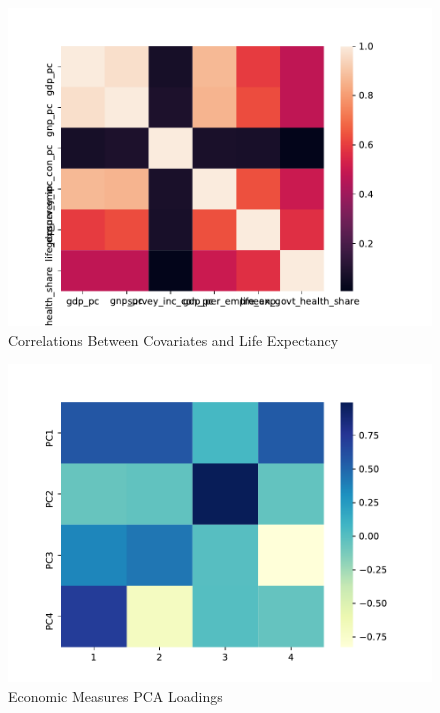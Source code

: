 \documentclass{report}
\begin{document}
	\begin{figure}[h!]
		\centering
		\caption{Correlations Between Covariates and Life Expectancy}
		\label{LE_Health_Econ_Correlations}	
		\includegraphics[width=\linewidth,keepaspectratio=true]{../Output/Figures/LE_Health_Econ_Correlations.pdf}
	\end{figure}

	\begin{figure}[h!]
		\centering
		\caption{Economic Measures PCA Loadings}
		\label{Econ_Loadings}	
		\includegraphics[width=\linewidth,keepaspectratio=true]{../Output/Figures/Econ_Indicator_Loadings.pdf}
	\end{figure}
\end{document}
